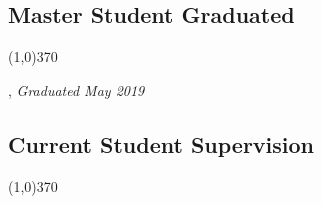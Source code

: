 \documentclass[10pt]{article}
\newenvironment{myindentpar}[1]%
{\begin{list}{}%
         {\setlength{\leftmargin}{#1}}%
         \item[]%
}
{\end{list}}
\newcounter{list}
\newcommand{\hide}[1]{}
\begin{document}
\hide{
\subsection{\sc Notre Dame Invited Presentations}
\vspace{-0.4cm} \line(1,0){370} \vspace{-0.1cm}

\begin{myindentpar}{0.75cm}

\hspace{-0.75cm} Graduate Seminar, Department of Psychology, October 2018

\end{myindentpar}
}

\subsection{\sc Master Student Graduated}
\vspace{-0.4cm} \line(1,0){370} \vspace{-0.1cm}

\begin{myindentpar}{0.75cm}

\hspace{-0.75cm}{\bf Xueying Wang}, \emph{Graduated May 2019} %

\end{myindentpar}

\subsection{\sc Current Student Supervision}
\vspace{-0.4cm} \line(1,0){370} \vspace{-0.1cm}
\end{document}
